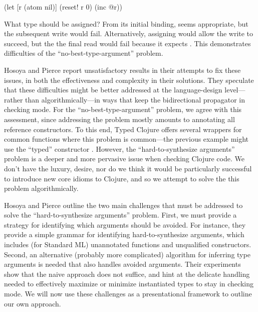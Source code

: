 {
\begin{cljlisting}
(let [r (atom nil)]
  (reset! r 0)
  (inc @r))
\end{cljlisting}
}

What type should  be assigned? From its initial binding,
 seems appropriate, but the subsequent write
would fail. Alternatively, assigning  would
allow the write to succeed, but the the final read would fail
because it expects .
This demonstrates difficulties of the ``no-best-type-argument'' problem.

Hosoya and Pierce report unsatisfactory results in their attempts to
fix these issues, in both the effectiveness and complexity
in their solutions.
They speculate that these difficulties might be better 
addressed at the language-design level---rather than algorithmically---in ways that
keep the bidirectional propagator in checking mode.
For the ``no-best-type-argument'' problem,
we agree with this assessment, since
addressing the problem mostly amounts to annotating 
all reference constructors.
To this end,
Typed Clojure offers several
wrappers for common functions where this problem
is common---the previous example might use the ``typed''
constructor
.
However, the ``hard-to-synthesize arguments'' problem
is a deeper and more pervasive issue when checking Clojure code.
We don't have the luxury, desire, nor do we think it would be particularly
successful to introduce new core idioms to Clojure,
and so we attempt to solve the this problem algorithmically.


Hosoya and Pierce outline the two main challenges that must be
addressed to solve the ``hard-to-synthesize arguments'' problem.
First, we must provide a strategy for identifying which arguments 
should be avoided.
For instance,
they provide a simple grammar for identifying hard-to-synthesize arguments,
which includes (for Standard ML) unannotated functions and unqualified constructors.
Second, an alternative (probably more complicated) algorithm
for inferring type arguments is needed that also handles
avoided arguments.
Their experiments show that the naive approach does not suffice,
and hint at the delicate handling needed to effectively maximize or minimize
instantiated types to stay in checking mode.
We will now use these challenges as a presentational framework to outline our own approach.

